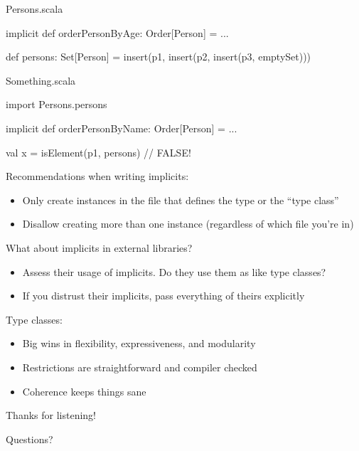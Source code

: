 \documentclass[usenames,dvipsnames,svgnames,table,aspectratio=169,mathserif]{beamer}
\newcommand{\nl}{\vspace{\baselineskip}}
\newcommand{\pnl}{\pause \nl}
\begin{document}
\begin{frame}[fragile]
\begin{block}{Persons.scala}
\begin{scalacode}
implicit def orderPersonByAge: Order[Person] = ...

def persons: Set[Person] =
  insert(p1, insert(p2, insert(p3, emptySet)))
\end{scalacode}
\end{block}

\nl

\begin{block}{Something.scala}
\begin{scalacode}
import Persons.persons

implicit def orderPersonByName: Order[Person] = ...

val x = isElement(p1, persons) // FALSE!
\end{scalacode}
\end{block}
\end{frame}


\begin{frame}
Recommendations when writing implicits:
\begin{itemize}
\item Only create instances in the file that defines the type or the ``type class''
\item Disallow creating more than one instance (regardless of which file you're in)
\end{itemize}

\pnl

What about implicits in external libraries?
\begin{itemize}
\item Assess their usage of implicits. Do they use them as like type classes?
\item If you distrust their implicits, pass everything of theirs explicitly
\end{itemize}
\end{frame}


\begin{frame}

Type classes:
\begin{itemize}
\item Big wins in flexibility, expressiveness, and modularity
\item Restrictions are straightforward and compiler checked
\item Coherence keeps things sane
\end{itemize}
\end{frame}


\begin{frame}
\begin{center}
\Huge{Thanks for listening!}

\nl

\Large{Questions?}
\end{center}
\end{frame}
\end{document}
